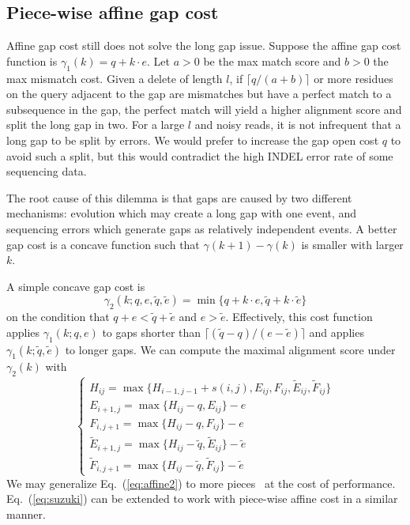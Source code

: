 \documentclass{bioinfo}
\begin{document}
\subsection{Piece-wise affine gap cost}

Affine gap cost still does not solve the long gap issue. Suppose the affine gap
cost function is $\gamma_1(k)=q+k\cdot e$. Let $a>0$ be the max match score and
$b>0$ the max mismatch cost. Given a delete of length $l$, if $\lceil
q/(a+b)\rceil$ or more residues on the query adjacent to the gap are mismatches
but have a perfect match to a subsequence in the gap, the perfect match will
yield a higher alignment score and split the long gap in two.  For a large $l$
and noisy reads, it is not infrequent that a long gap to be split by errors. We
would prefer to increase the gap open cost $q$ to avoid such a split, but this
would contradict the high INDEL error rate of some sequencing data.

The root cause of this dilemma is that gaps are caused by two different
mechanisms: evolution which may create a long gap with one event, and
sequencing errors which generate gaps as relatively independent events. A
better gap cost is a concave function such that $\gamma(k+1)-\gamma(k)$ is
smaller with larger $k$.

A simple concave gap cost is
\[
\gamma_2(k;q,e,\tilde{q},\tilde{e})=\min\{q+k\cdot e,\tilde{q}+k\cdot\tilde{e}\}
\]
on the condition that $q+e<\tilde{q}+\tilde{e}$ and $e>\tilde{e}$. Effectively,
this cost function applies $\gamma_1(k;q,e)$ to gaps shorter than
$\lceil(\tilde{q}-q)/(e-\tilde{e})\rceil$ and applies
$\gamma_1(k;\tilde{q},\tilde{e})$ to longer gaps. We can compute the maximal
alignment score under $\gamma_2(k)$ with
\begin{equation}\label{eq:affine2}
\left\{\begin{array}{l}
H_{ij} = \max\{H_{i-1,j-1}+s(i,j),E_{ij},F_{ij},\tilde{E}_{ij},\tilde{F}_{ij}\}\\
E_{i+1,j}= \max\{H_{ij}-q,E_{ij}\}-e\\
F_{i,j+1}= \max\{H_{ij}-q,F_{ij}\}-e\\
\tilde{E}_{i+1,j}= \max\{H_{ij}-\tilde{q},\tilde{E}_{ij}\}-\tilde{e}\\
\tilde{F}_{i,j+1}= \max\{H_{ij}-\tilde{q},\tilde{F}_{ij}\}-\tilde{e}
\end{array}\right.
\end{equation}
We may generalize Eq.~(\ref{eq:affine2}) to more pieces~\citep{Gotoh:1990aa} at the
cost of performance. Eq.~(\ref{eq:suzuki}) can be extended to work with
piece-wise affine cost in a similar manner.


\end{document}
